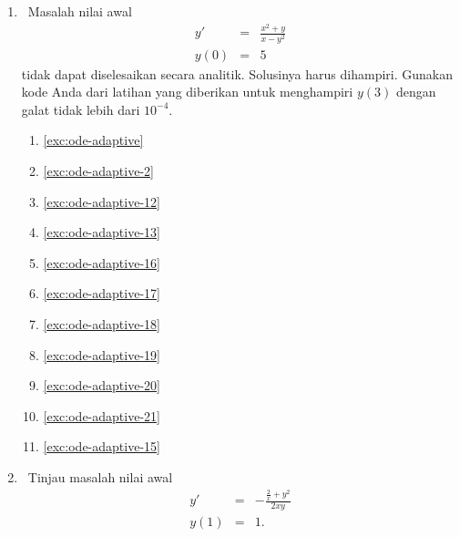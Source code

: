 \begin{enumerate}
\begin{enumerate}
\item \label{exc:ode-adaptive-25}\ref{exc:ode-adaptive} \hasasolution 
\item \ref{exc:ode-adaptive-2}
\item \ref{exc:ode-adaptive-12}
\item \label{exc:ode-adaptive-26}\ref{exc:ode-adaptive-13} \hasananswer 
\item \ref{exc:ode-adaptive-16}
\item \label{exc:ode-adaptive-27}\ref{exc:ode-adaptive-17} \hasananswer 
\item \ref{exc:ode-adaptive-18}
\item \ref{exc:ode-adaptive-19}
\item \ref{exc:ode-adaptive-20}
\item \ref{exc:ode-adaptive-21}
\item \ref{exc:ode-adaptive-15}
\end{enumerate}
\item \octave\ \label{exc:ode-adaptive-23}Masalah nilai awal
\begin{eqnarray}
y' & = & \frac{x^{2}+y}{x-y^{2}}\nonumber \\
y(0) & = & 5\label{eq:non-oscillatory}
\end{eqnarray}
tidak dapat diselesaikan secara analitik. Solusinya harus dihampiri.
Gunakan kode Anda dari latihan yang diberikan untuk menghampiri $y(3)$
dengan galat tidak lebih dari $10^{-4}$.

\begin{enumerate}
\item \label{exc:ode-adaptive-28}\ref{exc:ode-adaptive} \hasasolution 
\item \ref{exc:ode-adaptive-2}
\item \ref{exc:ode-adaptive-12}
\item \label{exc:ode-adaptive-29}\ref{exc:ode-adaptive-13} \hasananswer 
\item \ref{exc:ode-adaptive-16}
\item \label{exc:ode-adaptive-30}\ref{exc:ode-adaptive-17} \hasananswer 
\item \ref{exc:ode-adaptive-18}
\item \ref{exc:ode-adaptive-19}
\item \ref{exc:ode-adaptive-20}
\item \ref{exc:ode-adaptive-21}
\item \ref{exc:ode-adaptive-15}
\end{enumerate}
\item \octave\ Tinjau masalah nilai awal
\begin{eqnarray*}
y' & = & -\frac{\frac{2}{x}+y^{2}}{2xy}\\
y(1) & = & 1.
\end{eqnarray*}


\end{enumerate}
